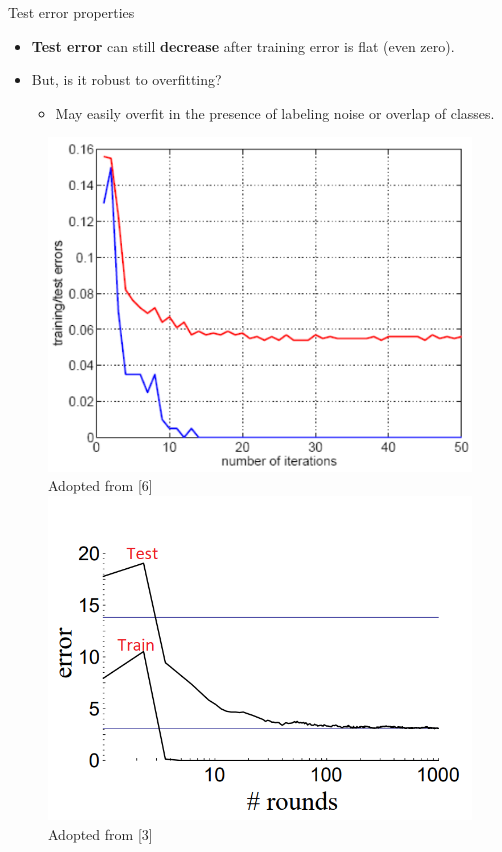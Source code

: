\documentclass[serif, aspectratio=169]{beamer}
\begin{document}
\begin{frame}{Test error properties}
    \begin{itemize}
        \itemsep1em
        \justifying
        \item \textbf{Test error} can still \textbf{decrease} after training error is flat (even zero).
        \item But, is it robust to overfitting?
        \begin{itemize}
            \item May easily overfit in the presence of labeling noise or overlap of classes.
        \end{itemize}
    \end{itemize}
    \vfill
    \begin{center}
        \begin{figure}[!htb]
            \centering
            \includegraphics[width=\linewidth]{pic/boosting_traintest1.png}
            {\scriptsize Adopted from [6]}
        \endminipage \qquad
            \centering
            \includegraphics[width=\linewidth]{pic/boosting_traintest2.png}
            {\scriptsize Adopted from [3]}
        \endminipage
        \end{figure}
    \end{center}
\end{frame}
\end{document}
